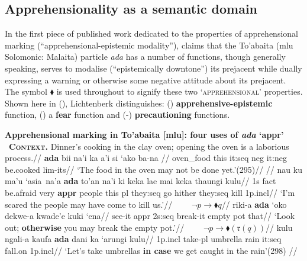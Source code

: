 \subsection{Apprehensionality as a semantic domain}\label{typ.appr}

In the first piece of published work dedicated to the properties of apprehensional marking (``apprehensional-epistemic modality''), \citet{Lichtenberk1995} claims that the To'abaita (\gls{mlu} Solomonic: Malaita) particle \textit{ada} has a number of functions, though generally speaking, serves to modalise (``epistemically downtone'') its prejacent while dually expressing a warning or otherwise some negative attitude about its prejacent. The symbol $ \blacklozenge $ is used throughout to signify these two `\textsc{apprehensional}' properties. Shown here in (), Lichtenberk distinguishes: () \textbf{apprehensive-epistemic} function, () a \textbf{fear} function and (-) \textbf{precautioning} functions.

	\pex \textbf{Apprehensional marking in To'abaita [\gls{mlu}]: four uses of \textit{ada} `\gls{appr}'}
	\a{}%
	\begingl %
	\glpreamble {}\\\ \textbf{\textsc{Context}.} Dinner's cooking in the clay oven; opening the oven is a laborious process.//
	\gla \textbf{ada} bii na'i ka a'i si `ako ba-na // 
	\glb {} oven\_food this it:{\sc seq} {\sc neg} it{\sc:neg} be.cooked {\sc lim-}its//
	\glft `The food in the oven may not be done yet.'\hfill(295)//%
	\endgl %
	\a{}\begingl
	\glpreamble {}//
	\gla nau ku ma'u `asia~na'a \textbf{ada} to'an na'i ki keka lae mai keka thaungi kulu//
	\glb 1s \gls{fact} be.afraid very \textbf{\gls{appr}} people this \gls{pl} they:\gls{seq} go hither they:\gls{seq} kill 1p.\gls{incl}//
	\glft`I'm scared the people may have come to kill us.'//
	\endgl
	\a{}\begingl\glpreamble{}$ \qquad \neg p\to\blacklozenge q $//
	\gla riki-a \textbf{ada} `oko dekwe-a kwade'e kuki `ena//
	\glb see-it \gls{appr} 2s:\gls{seq} break-it empty pot that//
	\glft`Look out; \textbf{otherwise} you may break the empty pot.'//\endgl
	\a{}\begingl\glpreamble {}$ \qquad \neg p\to\blacklozenge(\mathfrak{r}(q)) $//
	\gla kulu ngali-a kaufa \textbf{ada} dani ka `arungi kulu//
	\glb 1p{\sc.incl} take{\sc-pl} umbrella  rain it:{\sc seq} fall.on 1p{\sc.incl}//
	\glft `Let's take umbrellas \textbf{in case} we get caught in the rain'\hfill(298) //\endgl
	\xe


